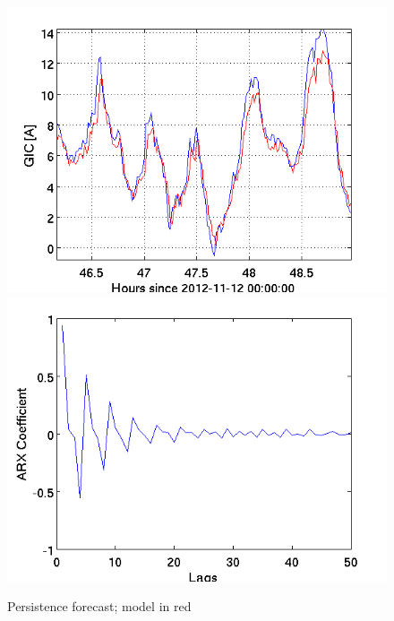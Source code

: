 \documentclass[10pt]{article}
\begin{document}
\begin{figure}[h!]
\centering
\includegraphics[scale=0.45]{GICshift.png}
\includegraphics[scale=0.45]{GICCoef.png}
\caption{Persistence forecast; model in red}
\label{persist}
\end{figure}
\end{document}
